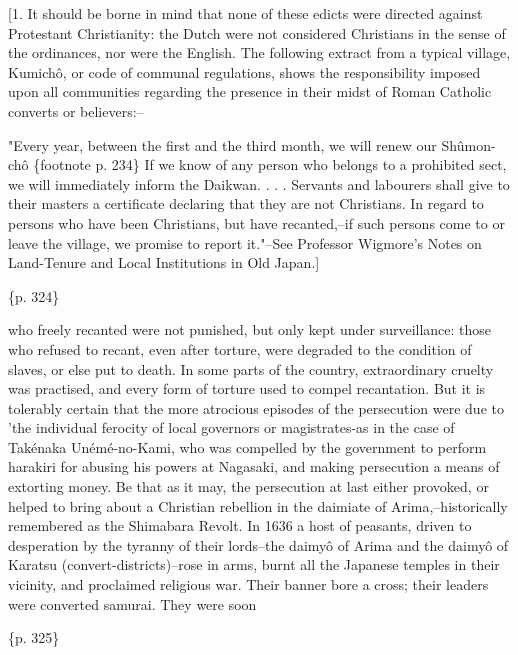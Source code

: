 [1. It should be borne in mind that none of these edicts were directed against Protestant Christianity: the Dutch were not considered Christians in the sense of the ordinances, nor were the English. The following extract from a typical village, Kumichô, or code of communal regulations, shows the responsibility imposed upon all communities regarding the presence in their midst of Roman Catholic converts or believers:--

"Every year, between the first and the third month, we will renew our Shûmon-chô \{footnote p. 234\} If we know of any person who belongs to a prohibited sect, we will immediately inform the Daikwan. . . . Servants and labourers shall give to their masters a certificate declaring that they are not Christians. In regard to persons who have been Christians, but have recanted,--if such persons come to or leave the village, we promise to report it."--See Professor Wigmore's Notes on Land-Tenure and Local Institutions in Old Japan.]

\{p. 324\}

who freely recanted were not punished, but only kept under surveillance: those who refused to recant, even after torture, were degraded to the condition of slaves, or else put to death. In some parts of the country, extraordinary cruelty was practised, and every form of torture used to compel recantation. But it is tolerably certain that the more atrocious episodes of the persecution were due to 'the individual ferocity of local governors or magistrates-as in the case of Takénaka Unémé-no-Kami, who was compelled by the government to perform harakiri for abusing his powers at Nagasaki, and making persecution a means of extorting money. Be that as it may, the persecution at last either provoked, or helped to bring about a Christian rebellion in the daimiate of Arima,--historically remembered as the Shimabara Revolt. In 1636 a host of peasants, driven to desperation by the tyranny of their lords--the daimyô of Arima and the daimyô of Karatsu (convert-districts)--rose in arms, burnt all the Japanese temples in their vicinity, and proclaimed religious war. Their banner bore a cross; their leaders were converted samurai. They were soon

\{p. 325\}


